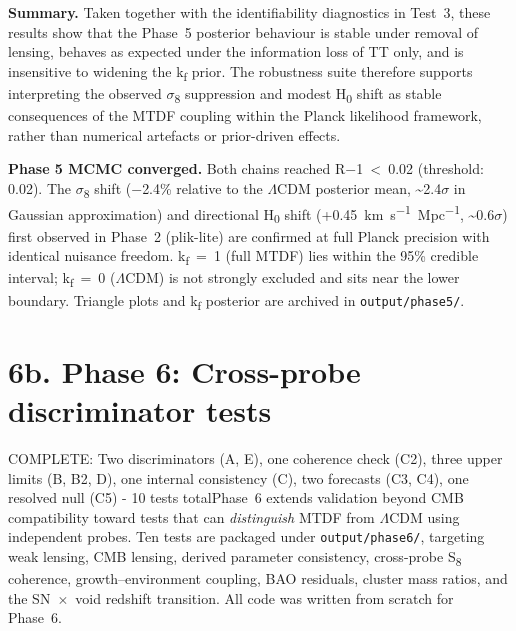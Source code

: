 \documentclass[11pt,a4paper]{article}
\begin{document}
\textbf{Summary.}
Taken together with the identifiability diagnostics in Test~3, these results show that the Phase~5 posterior behaviour is stable under removal of lensing, behaves as expected under the information loss of TT only, and is insensitive to widening the k\textsubscript{f} prior. The robustness suite therefore supports interpreting the observed $\sigma$\textsubscript{8} suppression and modest H\textsubscript{0} shift as stable consequences of the MTDF coupling within the Planck likelihood framework, rather than numerical artefacts or prior-driven effects.

\begin{mdframed}[linecolor=accent,linewidth=0.5pt,backgroundcolor=callout-bg,leftline=true,rightline=true,topline=true,bottomline=true,innerleftmargin=8pt,innerrightmargin=8pt,innertopmargin=6pt,innerbottommargin=6pt]
\textbf{Phase 5 MCMC converged.}
Both chains reached R$-$1~<~0.02 (threshold: 0.02). The $\sigma$\textsubscript{8} shift ($-$2.4\% relative to the $\Lambda$CDM posterior mean, \~{}2.4$\sigma$ in Gaussian approximation) and directional H\textsubscript{0} shift (+0.45~km~s\textsuperscript{$-$1}~Mpc\textsuperscript{$-$1}, \~{}0.6$\sigma$) first observed in Phase~2 (plik-lite) are confirmed at full Planck precision with identical nuisance freedom. k\textsubscript{f}~=~1 (full MTDF) lies within the 95\% credible interval; k\textsubscript{f}~=~0 ($\Lambda$CDM) is not strongly excluded and sits near the lower boundary. Triangle plots and k\textsubscript{f} posterior are archived in \texttt{output/\allowbreak{}phase5/\allowbreak{}}.
\end{mdframed}

\section{6b. Phase 6: Cross-probe discriminator tests}
\label{sec:sec6b}
COMPLETE: Two discriminators (A, E), one coherence check (C2), three upper limits (B, B2, D), one internal consistency (C), two forecasts (C3, C4), one resolved null (C5)  -  10 tests totalPhase~6 extends validation beyond CMB compatibility toward tests that can \emph{distinguish} MTDF from $\Lambda$CDM using independent probes. Ten tests are packaged under \texttt{output/\allowbreak{}phase6/\allowbreak{}}, targeting weak lensing, CMB lensing, derived parameter consistency, cross-probe S\textsubscript{8} coherence, growth--environment coupling, BAO residuals, cluster mass ratios, and the SN~$\times$~void redshift transition. All code was written from scratch for Phase~6.
\end{document}
